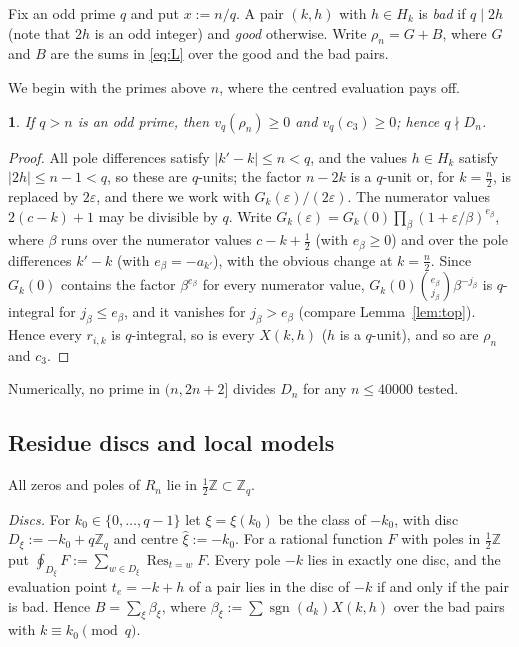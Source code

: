 \documentclass{amsart}
\newcommand{\thisthmname}{}
\newtheorem*{genericthm}{\thisthmname}
\newenvironment{namedthm}[1]{\renewcommand{\thisthmname}{#1}\begin{genericthm}}{\end{genericthm}}
\theoremstyle{definition}
\theoremstyle{remark}
\numberwithin{equation}{section}
\newcommand{\Z}{\mathbb{Z}}
\newcommand{\sgn}{\operatorname{sgn}}
\newcommand{\Res}{\operatorname{Res}}
\begin{document}
Fix an odd prime $q$ and put $x:=n/q$. A pair $(k,h)$ with $h\in H_k$ is
\emph{bad} if $q\mid2h$ (note that $2h$ is an odd integer) and \emph{good}
otherwise. Write $\rho_n=G+B$, where $G$ and $B$ are the sums in
\eqref{eq:L} over the good and the bad pairs.

We begin with the primes above $n$, where the centred evaluation pays off.

\begin{namedthm}{Theorem C}
If $q>n$ is an odd prime, then $v_q(\rho_n)\ge0$ and $v_q(c_3)\ge0$; hence
$q\nmid D_n$.
\end{namedthm}

\begin{proof}
All pole differences satisfy $|k'-k|\le n<q$, and the values $h\in H_k$
satisfy $|2h|\le n-1<q$, so these are $q$-units; the factor $n-2k$ is a
$q$-unit or, for $k=\frac n2$, is replaced by $2\varepsilon$, and there we
work with $G_k(\varepsilon)/(2\varepsilon)$. The numerator values
$2(c-k)+1$ may be divisible by $q$. Write
$G_k(\varepsilon)=G_k(0)\prod_\beta(1+\varepsilon/\beta)^{e_\beta}$, where
$\beta$ runs over the numerator values $c-k+\frac12$ (with $e_\beta\ge0$) and
over the pole differences $k'-k$ (with $e_\beta=-a_{k'}$), with the obvious
change at $k=\frac n2$. Since $G_k(0)$ contains the factor $\beta^{e_\beta}$
for every numerator value, $G_k(0)\binom{e_\beta}{j_\beta}\beta^{-j_\beta}$ is
$q$-integral for $j_\beta\le e_\beta$, and it vanishes for $j_\beta>e_\beta$
(compare Lemma~\ref{lem:top}). Hence every $r_{i,k}$ is $q$-integral, so is
every $X(k,h)$ ($h$ is a $q$-unit), and so are $\rho_n$ and $c_3$.
\end{proof}

Numerically, no prime in $(n,2n+2]$ divides $D_n$ for any $n\le40000$ tested.

\subsection{Residue discs and local models}\label{ss:discs}

All zeros and poles of $R_n$ lie in $\frac12\Z\subset\Z_q$.

\emph{Discs.} For $k_0\in\{0,\dots,q-1\}$ let $\xi=\xi(k_0)$ be the class of
$-k_0$, with disc $D_\xi:=-k_0+q\Z_q$ and centre $\hat\xi:=-k_0$. For a
rational function $F$ with poles in $\frac12\Z$ put
$\oint_{D_\xi}F:=\sum_{w\in D_\xi}\Res_{t=w}F$. Every pole $-k$ lies in
exactly one disc, and the evaluation point $t_e=-k+h$ of a pair lies in the
disc of $-k$ if and only if the pair is bad. Hence
$B=\sum_\xi\beta_\xi$, where
$\beta_\xi:=\sum\sgn(d_k)X(k,h)$ over the bad pairs with $k\equiv k_0\pmod q$.
\end{document}
